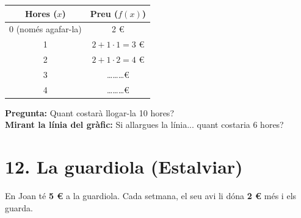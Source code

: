 \documentclass[12pt,a4paper]{article}
\begin{document}
\noindent
\begin{minipage}[t]{0.45\textwidth}
    \vspace{0pt}
    \renewcommand{\arraystretch}{1.4}
    \begin{tabular}{|c|c|}
        \hline
        \textbf{Hores ($x$)} & \textbf{Preu ($f(x)$)} \\ \hline
        0 (només agafar-la) & 2 € \\ \hline
        1 & $2 + 1 \cdot 1 = 3$ € \\ \hline
        2 & $2 + 1 \cdot 2 = 4$ € \\ \hline
        3 & \dots\dots\dots € \\ \hline
        4 & \dots\dots\dots € \\ \hline
    \end{tabular}
\end{minipage}%
\hfill
\begin{minipage}[t]{0.5\textwidth}
    \vspace{0pt}
\end{minipage}

\vspace{0.2cm}
\textbf{Pregunta:} Quant costarà llogar-la 10 hores? \hrulefill \\
\textbf{Mirant la línia del gràfic:} Si allargues la línia... quant costaria 6 hores? \hrulefill

\vspace{0.5cm}

\section*{12. La guardiola (Estalviar)}
En Joan té \textbf{5 €} a la guardiola. Cada setmana, el seu avi li dóna \textbf{2 €} més i els guarda.
\end{document}
